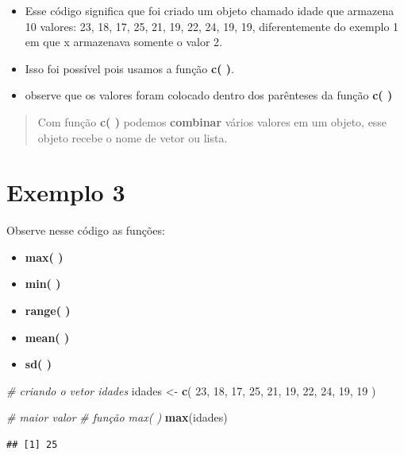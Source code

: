 \documentclass[
]{book}
\newenvironment{Shaded}{\begin{snugshade}}{\end{snugshade}}
\newcommand{\CommentTok}[1]{\textcolor[rgb]{0.56,0.35,0.01}{\textit{#1}}}
\newcommand{\DecValTok}[1]{\textcolor[rgb]{0.00,0.00,0.81}{#1}}
\newcommand{\FunctionTok}[1]{\textcolor[rgb]{0.13,0.29,0.53}{\textbf{#1}}}
\newcommand{\NormalTok}[1]{#1}
\newcommand{\OtherTok}[1]{\textcolor[rgb]{0.56,0.35,0.01}{#1}}
\begin{document}
\begin{itemize}
\item
  Esse código significa que foi criado um objeto chamado idade que armazena 10 valores: 23, 18, 17, 25, 21, 19, 22, 24, 19, 19, diferentemente do exemplo 1 em que x armazenava somente o valor 2.
\item
  Isso foi possível pois usamos a função \textbf{c( )}.
\item
  observe que os valores foram colocado dentro dos parênteses da função \textbf{c( )}
\end{itemize}

\begin{quote}
Com função \textbf{c( )} podemos \textbf{combinar} vários valores em um objeto, esse objeto recebe o nome de vetor ou lista.
\end{quote}

\section{Exemplo 3}\label{exemplo-3}

Observe nesse código as funções:

\begin{itemize}
\item
  \textbf{max( )}
\item
  \textbf{min( )}
\item
  \textbf{range( )}
\item
  \textbf{mean( )}
\item
  \textbf{sd( )}
\end{itemize}

\begin{Shaded}
\begin{Highlighting}[]
\CommentTok{\# criando o vetor idades }
\NormalTok{idades }\OtherTok{\textless{}{-}} \FunctionTok{c}\NormalTok{( }\DecValTok{23}\NormalTok{, }\DecValTok{18}\NormalTok{, }\DecValTok{17}\NormalTok{, }\DecValTok{25}\NormalTok{, }\DecValTok{21}\NormalTok{, }\DecValTok{19}\NormalTok{, }\DecValTok{22}\NormalTok{, }\DecValTok{24}\NormalTok{, }\DecValTok{19}\NormalTok{, }\DecValTok{19}\NormalTok{ )}

\CommentTok{\# maior valor}
\CommentTok{\# função max( )}
\FunctionTok{max}\NormalTok{(idades)}
\end{Highlighting}
\end{Shaded}

\begin{verbatim}
## [1] 25
\end{verbatim}
\end{document}
